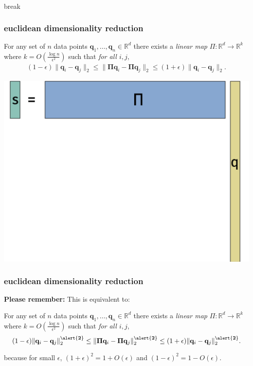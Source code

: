 \documentclass[compress]{beamer}
\newcommand{\bs}[1]{\boldsymbol{#1}}
\newcommand{\bv}[1]{\mathbf{#1}}
\newcommand{\R}{\mathbb{R}}
\begin{document}
\begin{frame}[standout]
	\begin{center}
		break
	\end{center}
\end{frame}


\begin{frame}
	\frametitle{euclidean dimensionality reduction}
	\begin{lemma}
		For any set of $n$ data points $\bv{q}_1,\ldots, \bv{q}_n \in \R^d$ there exists a \emph{linear map} $\Pi: \R^d \rightarrow \R^k$ where $k = O\left(\frac{\log n}{\epsilon^2}\right)$ such that \emph{for all $i,j$},
		\begin{align*}
			(1-\epsilon)\|\bv{q}_i - \bv{q}_j\|_2 \leq \|\bs{\Pi}\bv{q}_i - \bs{\Pi}\bv{q}_j\|_2 \leq (1+\epsilon)\|\bv{q}_i - \bv{q}_j\|_2.
		\end{align*}
	\end{lemma}
	\begin{center}
		\includegraphics[height=.45\textheight]{jl_sketch.png}
	\end{center}
\end{frame}

\begin{frame}
	\frametitle{euclidean dimensionality reduction}
	\textbf{Please remember:} This is equivalent to: 
	\begin{lemma}
		For any set of $n$ data points $\bv{q}_1,\ldots, \bv{q}_n \in \R^d$ there exists a \emph{linear map} $\Pi: \R^d \rightarrow \R^k$ where $k = O\left(\frac{\log n}{\epsilon^2}\right)$ such that \emph{for all $i,j$},
		\begin{align*}
			(1-\epsilon)\|\bv{q}_i - \bv{q}_j\|_2^{\mathbf{\alert{2}}} \leq \|\bs{\Pi}\bv{q}_i - \bs{\Pi}\bv{q}_j\|_2^{\mathbf{\alert{2}}} \leq (1+\epsilon)\|\bv{q}_i - \bv{q}_j\|_2^{\mathbf{\alert{2}}}.
		\end{align*}
	\end{lemma}
	because for small $\epsilon$, $(1+\epsilon)^2 = 1 + O(\epsilon)$ and $(1-\epsilon)^2 = 1 - O(\epsilon)$.
\end{frame}
\end{document}
